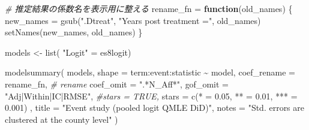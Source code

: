 \documentclass[
]{article}
\newenvironment{Shaded}{\begin{snugshade}}{\end{snugshade}}
\newcommand{\AttributeTok}[1]{\textcolor[rgb]{0.77,0.63,0.00}{#1}}
\newcommand{\CommentTok}[1]{\textcolor[rgb]{0.56,0.35,0.01}{\textit{#1}}}
\newcommand{\ControlFlowTok}[1]{\textcolor[rgb]{0.13,0.29,0.53}{\textbf{#1}}}
\newcommand{\FloatTok}[1]{\textcolor[rgb]{0.00,0.00,0.81}{#1}}
\newcommand{\FunctionTok}[1]{\textcolor[rgb]{0.00,0.00,0.00}{#1}}
\newcommand{\NormalTok}[1]{#1}
\newcommand{\OtherTok}[1]{\textcolor[rgb]{0.56,0.35,0.01}{#1}}
\newcommand{\SpecialCharTok}[1]{\textcolor[rgb]{0.00,0.00,0.00}{#1}}
\newcommand{\StringTok}[1]{\textcolor[rgb]{0.31,0.60,0.02}{#1}}
\begin{document}
\begin{Shaded}
\begin{Highlighting}[]
\CommentTok{\# 推定結果の係数名を表示用に整える}
\NormalTok{rename\_fn }\OtherTok{=} \ControlFlowTok{function}\NormalTok{(old\_names) \{}
\NormalTok{  new\_names }\OtherTok{=} \FunctionTok{gsub}\NormalTok{(}\StringTok{".Dtreat"}\NormalTok{, }\StringTok{"Years post treatment ="}\NormalTok{, old\_names)}
  \FunctionTok{setNames}\NormalTok{(new\_names, old\_names)}
\NormalTok{\}}

\NormalTok{models }\OtherTok{\textless{}{-}} \FunctionTok{list}\NormalTok{(}
               \StringTok{"Logit"} \OtherTok{=}\NormalTok{ es8logit)}

\FunctionTok{modelsummary}\NormalTok{(}
\NormalTok{  models, }
  \AttributeTok{shape       =}\NormalTok{ term}\SpecialCharTok{:}\NormalTok{event}\SpecialCharTok{:}\NormalTok{statistic }\SpecialCharTok{\textasciitilde{}}\NormalTok{ model, }
  \AttributeTok{coef\_rename =}\NormalTok{ rename\_fn, }\CommentTok{\# rename}
  \AttributeTok{coef\_omit =} \StringTok{".*N\_Aff*"}\NormalTok{, }
  \AttributeTok{gof\_omit    =} \StringTok{"Adj|Within|IC|RMSE"}\NormalTok{, }
  \CommentTok{\#stars       = TRUE,}
  \AttributeTok{stars =} \FunctionTok{c}\NormalTok{(}\StringTok{\textquotesingle{}*\textquotesingle{}} \OtherTok{=} \FloatTok{0.05}\NormalTok{, }\StringTok{\textquotesingle{}**\textquotesingle{}} \OtherTok{=} \FloatTok{0.01}\NormalTok{, }\StringTok{\textquotesingle{}***\textquotesingle{}} \OtherTok{=} \FloatTok{0.001}\NormalTok{) ,}
  \AttributeTok{title       =} \StringTok{"Event study (pooled logit QMLE DiD)"}\NormalTok{, }
  \AttributeTok{notes       =} \StringTok{"Std. errors are clustered at the county level"} 
\NormalTok{)}
\end{Highlighting}
\end{Shaded}
\end{document}
